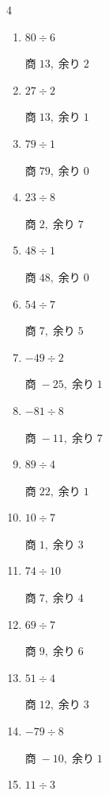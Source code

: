\begin{multicols}{4}
\begin{enumerate}
  \item $80 \div 6$

        $商\; 13,\; 余り\; 2$

  \item $27 \div 2$

        $商\; 13,\; 余り\; 1$

  \item $79 \div 1$

        $商\; 79,\; 余り\; 0$

  \item $23 \div 8$

        $商\; 2,\; 余り\; 7$

  \item $48 \div 1$

        $商\; 48,\; 余り\; 0$

  \item $54 \div 7$

        $商\; 7,\; 余り\; 5$

  \item $-49 \div 2$

        $商\; -25,\; 余り\; 1$

\columnbreak %

\resetques

  \item $-81 \div 8$

        $商\; -11,\; 余り\; 7$

  \item $89 \div 4$

        $商\; 22,\; 余り\; 1$

  \item $10 \div 7$

        $商\; 1,\; 余り\; 3$

  \item $74 \div 10$

        $商\; 7,\; 余り\; 4$

  \item $69 \div 7$

        $商\; 9,\; 余り\; 6$

  \item $51 \div 4$

        $商\; 12,\; 余り\; 3$

  \item $-79 \div 8$

        $商\; -10,\; 余り\; 1$

  \item $11 \div 3$


\end{enumerate}
\end{multicols}
